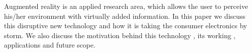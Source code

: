 Augmented reality is an applied research area, which allows the user
to perceive his/her environment with virtually added information.
In this paper we discuss this disruptive new technology and how it is
taking the consumer electronics by storm. 
We also discuss the motivation behind this technology , its working ,
applications and future scope.